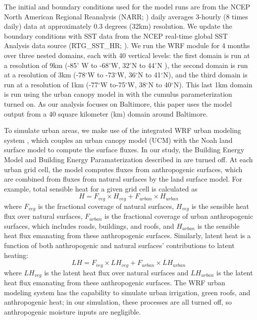 The initial and boundary conditions used for the model runs are from the NCEP North American Regional Reanalysis (NARR; \cite{mesinger2006north}) daily averages 3-hourly (8 times daily) data at approximately 0.3 degrees (32km) resolution. 
We update the boundary conditions with SST data from the NCEP real-time global SST Analysis data source (RTG{\_}SST{\_}HR; \cite{thiebaux2003new}). 
We run the WRF module for 4 months over three nested domains, each with 40 vertical levels: the first domain is run at a resolution of 9km (-85$^\circ$ W to -68$^\circ$W, 32$^\circ$N to 44$^\circ$N ), the second domain is run at a resolution of 3km (-78$^\circ$W to -73$^\circ$W, 36$^\circ$N to 41$^\circ$N), and the third domain is run at a resolution of 1km (-77$^\circ$W to-75$^\circ$W, 38$^\circ$N to 40$^\circ$N). This last 1km domain is run using the urban canopy model in \cite{chen2011integrated} with the cumulus parameterization turned on. 
As our analysis focuses on Baltimore, this paper uses the model output from a 40 square kilometer (km) domain around Baltimore.

To simulate urban areas, we make use of the integrated WRF urban modeling system \citep{chen2011integrated}, which couples an urban canopy model (UCM) with the Noah land surface model to compute the surface fluxes. In our study, the Building Energy Model and Building Energy Paramaterization described in \cite{chen2011integrated} are turned off. 
At each urban grid cell, the model computes fluxes from anthropogenic surfaces, which are combined from fluxes from natural surfaces by the land surface model. 
For example, total sensible heat for a given grid cell is calculated as \[ H = F_{veg} \times H_{veg} + F_{urban}\times H_{urban}\]
where $F_{veg}$ is the fractional coverage of natural surfaces, $H_{veg}$ is the sensible heat flux over natural surfaces, $F_{urban}$ is the fractional coverage of urban anthropogenic surfaces, which includes roads, buildings, and roofs, and $H_{urban}$ is the sensible heat flux emanating from these anthropogenic surfaces. Similarly, latent heat is a function of both anthropogenic and natural surfaces' contributions to latent heating: 
\[LH = F_{veg} \times LH_{veg} + F_{urban}\times LH_{urban}\]
where $LH_{veg}$ is the latent heat flux over natural surfaces and $LH_{urban}$ is the latent heat flux emanating from these anthropogenic surfaces.
The WRF urban modeling system has the capability to simulate urban irrigation, green roofs, and anthropogenic heat; in our simulation, these processes are all turned off, so anthropogenic moisture inputs are negligible.

